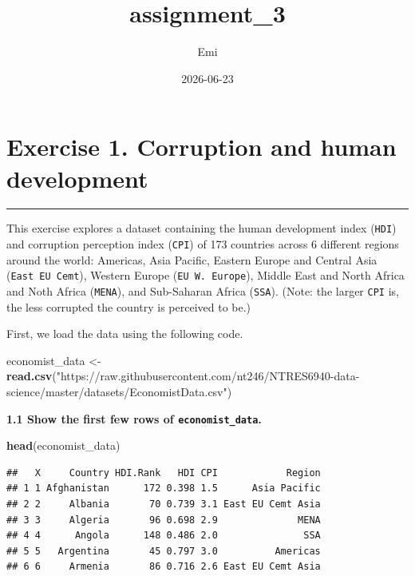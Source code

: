 \documentclass[
]{article}
\title{assignment\_3}
\author{Emi}
\date{2026-06-23}
\newenvironment{Shaded}{\begin{snugshade}}{\end{snugshade}}
\newcommand{\FunctionTok}[1]{\textcolor[rgb]{0.13,0.29,0.53}{\textbf{#1}}}
\newcommand{\NormalTok}[1]{#1}
\newcommand{\OtherTok}[1]{\textcolor[rgb]{0.56,0.35,0.01}{#1}}
\newcommand{\StringTok}[1]{\textcolor[rgb]{0.31,0.60,0.02}{#1}}
\begin{document}
\maketitle

\section{\texorpdfstring{\textbf{Exercise 1. Corruption and human
development}}{Exercise 1. Corruption and human development}}\label{exercise-1.-corruption-and-human-development}

\begin{center}\rule{0.5\linewidth}{0.5pt}\end{center}

This exercise explores a dataset containing the human development index
(\texttt{HDI}) and corruption perception index (\texttt{CPI}) of 173
countries across 6 different regions around the world: Americas, Asia
Pacific, Eastern Europe and Central Asia (\texttt{East\ EU\ Cemt}),
Western Europe (\texttt{EU\ W.\ Europe}), Middle East and North Africa
and Noth Africa (\texttt{MENA}), and Sub-Saharan Africa (\texttt{SSA}).
(Note: the larger \texttt{CPI} is, the less corrupted the country is
perceived to be.)

First, we load the data using the following code.

\begin{Shaded}
\begin{Highlighting}[]
\NormalTok{economist\_data }\OtherTok{\textless{}{-}} \FunctionTok{read.csv}\NormalTok{(}\StringTok{"https://raw.githubusercontent.com/nt246/NTRES6940{-}data{-}science/master/datasets/EconomistData.csv"}\NormalTok{)}
\end{Highlighting}
\end{Shaded}

\textbf{1.1 Show the first few rows of \texttt{economist\_data}.}

\begin{Shaded}
\begin{Highlighting}[]
\FunctionTok{head}\NormalTok{(economist\_data)}
\end{Highlighting}
\end{Shaded}

\begin{verbatim}
##   X     Country HDI.Rank   HDI CPI            Region
## 1 1 Afghanistan      172 0.398 1.5      Asia Pacific
## 2 2     Albania       70 0.739 3.1 East EU Cemt Asia
## 3 3     Algeria       96 0.698 2.9              MENA
## 4 4      Angola      148 0.486 2.0               SSA
## 5 5   Argentina       45 0.797 3.0          Americas
## 6 6     Armenia       86 0.716 2.6 East EU Cemt Asia
\end{verbatim}
\end{document}
